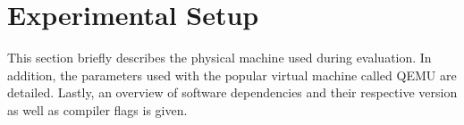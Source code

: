 \section{Experimental Setup}

This section briefly describes the physical machine used during evaluation.
In addition, the parameters used with the popular virtual machine called QEMU
\cite{qemu} are detailed. Lastly, an overview of software dependencies and their
respective version as well as compiler flags is given.



